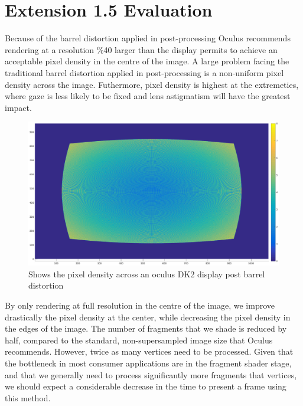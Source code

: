 \documentclass[12pt,a4paper,twoside,openright]{report}
\begin{document}
\section{Extension 1.5 Evaluation}

Because of the barrel distortion applied in post-processing Oculus recommends rendering at a resolution \%40 larger than the display permits to achieve an acceptable pixel density in the centre of the image.
A large problem facing the traditional barrel distortion applied in post-processing is a non-uniform pixel density across the image. Futhermore, pixel density is highest at the extremeties, where gaze is less likely to be fixed and lens astigmatism will have the greatest impact. 

\begin{figure}[tbh]
\begin{center}
\includegraphics[width=12cm]{figs/oculus_pixel_density.eps}
\caption{Shows the pixel density across an oculus DK2 display post barrel distortion}
\label{epsfig1}
\end{center}
\end{figure}

By only rendering at full resolution in the centre of the image, we improve drastically the pixel density at the center, while decreasing the pixel density in the edges of the image. The number of fragments that we shade is reduced by half, compared to the standard, non-supersampled image size that Oculus recommends. However, twice as many vertices need to be processed. Given that the bottleneck in most consumer applications are in the fragment shader stage, and that we generally need to process significantly more fragments that vertices, we should expect a considerable decrease in the time to present a frame using this method. 
\end{document}
